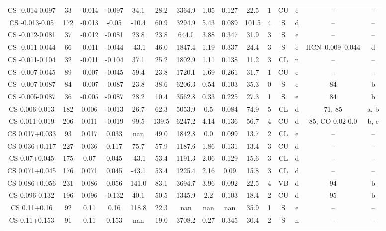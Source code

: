 \begin{table}
\begin{tabular}{ccccccccccccccc}
CS -0.014-0.097 & 33 & -0.014 & -0.097 & 34.1 & 28.2 & 3364.9 & 1.05 & 0.127 & 22.5 & 1 & CU & e & -- & -- \\
CS -0.013-0.05 & 172 & -0.013 & -0.05 & -10.4 & 60.9 & 3294.9 & 5.43 & 0.089 & 101.5 & 4 & S & d & -- & -- \\
CS -0.012-0.081 & 37 & -0.012 & -0.081 & 23.8 & 23.8 & 644.0 & 3.88 & 0.347 & 31.9 & 3 & S & e & -- & -- \\
CS -0.011-0.044 & 66 & -0.011 & -0.044 & -43.1 & 46.0 & 1847.4 & 1.19 & 0.337 & 24.4 & 3 & S & e & HCN–0.009–0.044 & d \\
CS -0.011-0.104 & 32 & -0.011 & -0.104 & 37.1 & 25.2 & 1802.9 & 1.11 & 0.138 & 11.2 & 3 & CL & n & -- & -- \\
CS -0.007-0.045 & 89 & -0.007 & -0.045 & 59.4 & 23.8 & 1720.1 & 1.69 & 0.261 & 31.7 & 1 & CU & e & -- & -- \\
CS -0.007-0.087 & 84 & -0.007 & -0.087 & 23.8 & 38.6 & 6206.3 & 0.54 & 0.103 & 35.3 & 0 & S & e & 84 & b \\
CS -0.005-0.087 & 36 & -0.005 & -0.087 & 28.2 & 10.4 & 3562.8 & 0.33 & 0.225 & 27.3 & 1 & S & e & 84 & b \\
CS 0.006-0.013 & 182 & 0.006 & -0.013 & 26.7 & 62.3 & 5053.9 & 0.5 & 0.084 & 74.9 & 5 & CL & d & 71, 85 & a, b \\
CS 0.011-0.019 & 206 & 0.011 & -0.019 & 99.5 & 139.5 & 6247.2 & 4.14 & 0.136 & 56.7 & 4 & CU & d & 85, CO 0.02-0.0 & b, c \\
CS 0.017+0.033 & 93 & 0.017 & 0.033 & nan & 49.0 & 1842.8 & 0.0 & 0.099 & 13.7 & 2 & CL & e & -- & -- \\
CS 0.036+0.117 & 227 & 0.036 & 0.117 & 75.7 & 57.9 & 1187.6 & 1.86 & 0.131 & 13.4 & 3 & CU & d & -- & -- \\
CS 0.07+0.045 & 175 & 0.07 & 0.045 & -43.1 & 53.4 & 1191.3 & 2.06 & 0.129 & 15.6 & 3 & CL & d & -- & -- \\
CS 0.071+0.045 & 176 & 0.071 & 0.045 & -43.1 & 53.4 & 1225.4 & 2.16 & 0.09 & 15.8 & 3 & CL & d & -- & -- \\
CS 0.086+0.056 & 231 & 0.086 & 0.056 & 141.0 & 83.1 & 3694.7 & 3.96 & 0.092 & 22.5 & 4 & VB & d & 94 & b \\
CS 0.096-0.132 & 196 & 0.096 & -0.132 & 40.1 & 50.5 & 1345.9 & 2.2 & 0.103 & 18.4 & 2 & CU & d & 95 & b \\
CS 0.11+0.16 & 92 & 0.11 & 0.16 & 118.8 & 22.3 & nan & nan & nan & 35.9 & 1 & S & e & -- & -- \\
CS 0.11+0.153 & 91 & 0.11 & 0.153 & nan & 19.0 & 3708.2 & 0.27 & 0.345 & 30.4 & 2 & S & n & -- & -- \\

\end{tabular}
\end{table}
